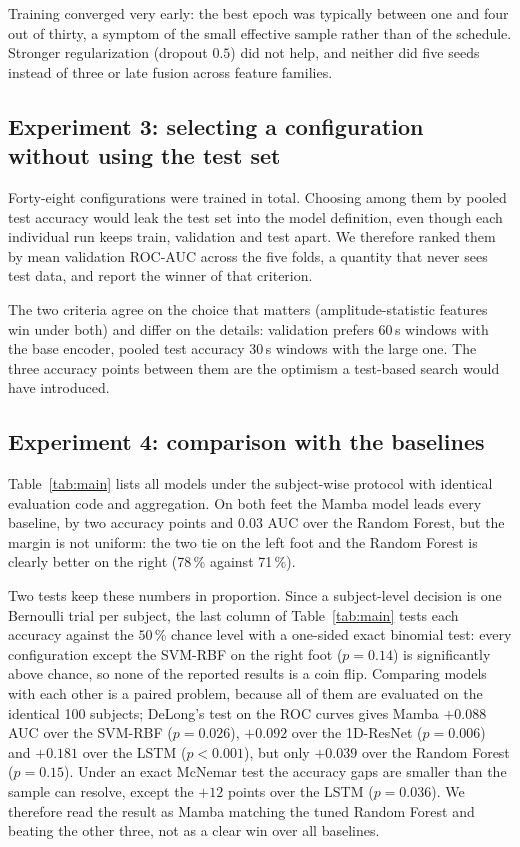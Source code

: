 Training converged very early: the best epoch was typically between one and four
out of thirty, a symptom of the small effective sample rather than of the
schedule. Stronger regularization (dropout $0.5$) did not help, and neither did
five seeds instead of three or late fusion across feature families.

\subsection{Experiment 3: selecting a configuration without using the test set}
\label{ssec:selection}
Forty-eight configurations were trained in total. Choosing among them by pooled
test accuracy would leak the test set into the model definition, even though
each individual run keeps train, validation and test apart. We therefore ranked
them by mean validation ROC-AUC across the five folds, a quantity that never
sees test data, and report the winner of that criterion.

The two criteria agree on the choice that matters (amplitude-statistic features
win under both) and differ on the details: validation prefers 60\,s windows
with the base encoder, pooled test accuracy 30\,s windows with the large one.
The three accuracy points between them are the optimism a test-based search
would have introduced.

\subsection{Experiment 4: comparison with the baselines}
\label{ssec:baselines}
Table~\ref{tab:main} lists all models under the subject-wise protocol with
identical evaluation code and aggregation. On both feet the Mamba model
leads every baseline, by two accuracy points and $0.03$ AUC over the Random
Forest, but the margin is not uniform: the two tie on the left foot and the
Random Forest is clearly better on the right (78\,\% against 71\,\%).

Two tests keep these numbers in proportion. Since a subject-level decision is
one Bernoulli trial per subject, the last column of Table~\ref{tab:main} tests
each accuracy against the $50$\,\% chance level with a one-sided exact binomial
test: every configuration except the SVM-RBF on the right foot ($p=0.14$) is
significantly above chance, so none of the reported results is a coin flip.
Comparing models with each other is a paired problem, because all of them are
evaluated on the identical 100 subjects; DeLong's test on the ROC curves gives
Mamba $+0.088$ AUC over the SVM-RBF ($p=0.026$), $+0.092$ over the 1D-ResNet
($p=0.006$) and $+0.181$ over the LSTM ($p<0.001$), but only $+0.039$ over the
Random Forest ($p=0.15$). Under an exact McNemar test the accuracy gaps are
smaller than the sample can resolve, except the $+12$ points over the LSTM
($p=0.036$). We therefore read the result as Mamba matching the tuned Random
Forest and beating the other three, not as a clear win over all baselines.

